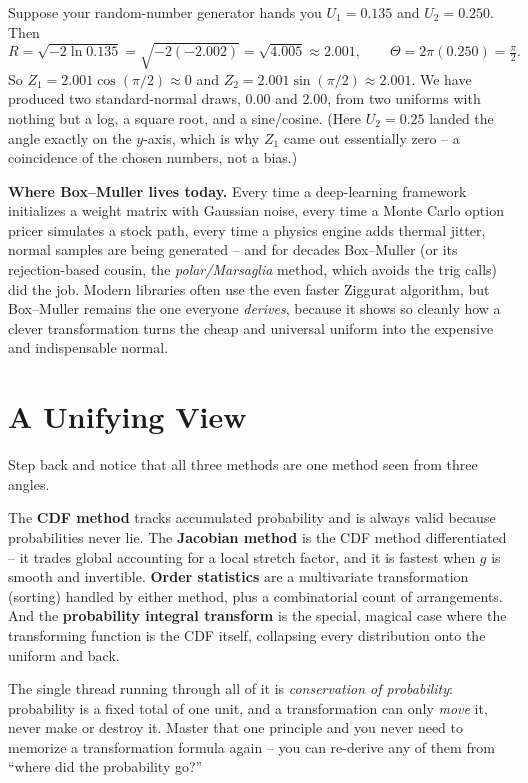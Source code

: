 \begin{example}
\label{ch16:bm-example}
Suppose your random-number generator hands you $U_1 = 0.135$ and $U_2 = 0.250$. Then
\[
  R = \sqrt{-2\ln 0.135} = \sqrt{-2(-2.002)} = \sqrt{4.005} \approx 2.001,
  \qquad \Theta = 2\pi(0.250) = \tfrac{\pi}{2}.
\]
So $Z_1 = 2.001\cos(\pi/2) \approx 0$ and $Z_2 = 2.001\sin(\pi/2) \approx 2.001$. We have
produced two standard-normal draws, $0.00$ and $2.00$, from two uniforms with nothing but a
log, a square root, and a sine/cosine. (Here $U_2 = 0.25$ landed the angle exactly on the
$y$-axis, which is why $Z_1$ came out essentially zero -- a coincidence of the chosen
numbers, not a bias.)
\end{example}

\begin{applicationbox}
\textbf{Where Box--Muller lives today.} Every time a deep-learning framework initializes a
weight matrix with Gaussian noise, every time a Monte Carlo option pricer simulates a
stock path, every time a physics engine adds thermal jitter, normal samples are being
generated -- and for decades Box--Muller (or its rejection-based cousin, the
\emph{polar/Marsaglia} method, which avoids the trig calls) did the job. Modern libraries
often use the even faster Ziggurat algorithm, but Box--Muller remains the one everyone
\emph{derives}, because it shows so cleanly how a clever transformation turns the cheap and
universal uniform into the expensive and indispensable normal.
\end{applicationbox}

\section{A Unifying View}
\label{ch16:unify}

\begin{aestheticbox}
Step back and notice that all three methods are one method seen from three angles.

The \textbf{CDF method} tracks accumulated probability and is always valid because
probabilities never lie. The \textbf{Jacobian method} is the CDF method differentiated --
it trades global accounting for a local stretch factor, and it is fastest when $g$ is
smooth and invertible. \textbf{Order statistics} are a multivariate transformation
(sorting) handled by either method, plus a combinatorial count of arrangements. And the
\textbf{probability integral transform} is the special, magical case where the
transforming function is the CDF itself, collapsing every distribution onto the uniform and
back.

The single thread running through all of it is \emph{conservation of probability}:
probability is a fixed total of one unit, and a transformation can only \emph{move} it,
never make or destroy it. Master that one principle and you never need to memorize a
transformation formula again -- you can re-derive any of them from ``where did the
probability go?''
\end{aestheticbox}

